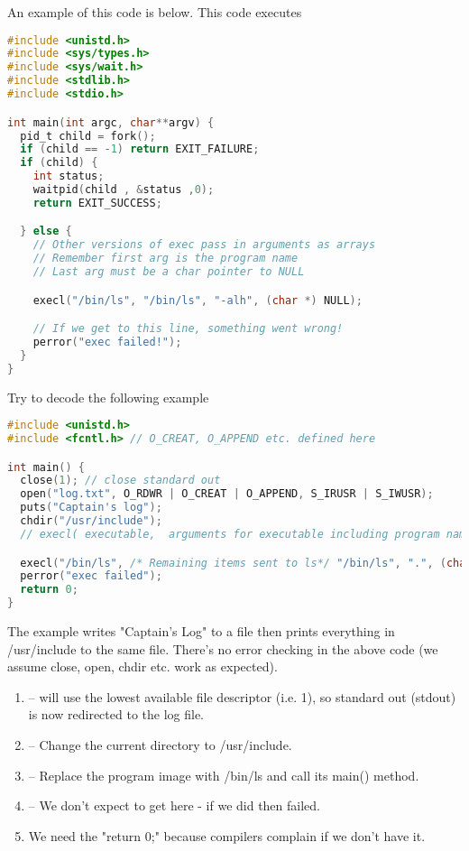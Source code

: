 An example of this code is below. This code executes 

\begin{lstlisting}[language=C]
#include <unistd.h>
#include <sys/types.h>
#include <sys/wait.h>
#include <stdlib.h>
#include <stdio.h>

int main(int argc, char**argv) {
  pid_t child = fork();
  if (child == -1) return EXIT_FAILURE;
  if (child) {
    int status;
    waitpid(child , &status ,0);
    return EXIT_SUCCESS;

  } else {
    // Other versions of exec pass in arguments as arrays
    // Remember first arg is the program name
    // Last arg must be a char pointer to NULL

    execl("/bin/ls", "/bin/ls", "-alh", (char *) NULL);

    // If we get to this line, something went wrong!
    perror("exec failed!");
  }
}
\end{lstlisting}

Try to decode the following example

\begin{lstlisting}[language=C]
#include <unistd.h>
#include <fcntl.h> // O_CREAT, O_APPEND etc. defined here

int main() {
  close(1); // close standard out
  open("log.txt", O_RDWR | O_CREAT | O_APPEND, S_IRUSR | S_IWUSR);
  puts("Captain's log");
  chdir("/usr/include");
  // execl( executable,  arguments for executable including program name and NULL at the end)

  execl("/bin/ls", /* Remaining items sent to ls*/ "/bin/ls", ".", (char *) NULL); // "ls ."
  perror("exec failed");
  return 0;
}
\end{lstlisting}

The example writes "Captain's Log" to a file then prints everything in /usr/include to the same file.
There's no error checking in the above code (we assume close, open, chdir etc. work as expected).

\begin{enumerate}
    \item {} -- will use the lowest available file descriptor (i.e. 1), so standard out (stdout) is now redirected to the log file.
    \item {} -- Change the current directory to /usr/include.
    \item {} -- Replace the program image with /bin/ls and call its main() method.
    \item {} -- We don't expect to get here - if we did then  failed.
    \item We need the "return 0;" because compilers complain if we don't have it.
\end{enumerate}

